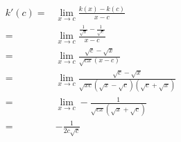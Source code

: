 \documentclass{article}
\begin{document}
            \paragraph{
                \begin{equation*}
                    \begin{split}
                        k'(c)=&\lim_{x\rightarrow c}\frac{k(x)-k(c)}{x-c}\\
                            =&\lim_{x\rightarrow c}\frac{\frac{1}{\sqrt{x}}-\frac{1}{\sqrt{c}}}{x-c}\\
                            =&\lim_{x\rightarrow c} \frac{\sqrt{c}-\sqrt{x}}{\sqrt{cx}(x-c)}\\
                            =&\lim_{x\rightarrow c}\frac{\sqrt{c}-\sqrt{x}}{\sqrt{xc}(\sqrt{x}-\sqrt{c})(\sqrt{c}+\sqrt{x})}\\
                            =&\lim_{x\rightarrow c}-\frac{1}{\sqrt{cx}(\sqrt{x}+\sqrt{c})}\\
                            =&-\frac{1}{2c\sqrt{c}}
                    \end{split}
                \end{equation*}
            }
\end{document}
